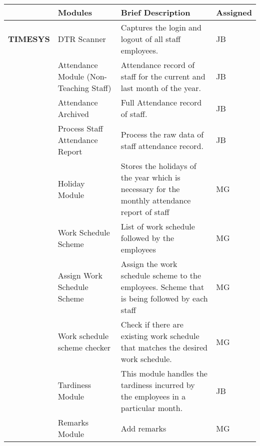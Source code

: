     
\begin{table}[H]
    \begin{tabularx}{\textwidth}{|p{2cm}|p{3.5cm}|X|p{1.5cm}|}
    \toprule
    \multicolumn{1}{|l|}{} & \textbf{Modules}                    & \textbf{Brief Description}                                                                    & \textbf{Assigned} \\ \midrule
    \textbf{TIMESYS}     & DTR Scanner                           & Captures the login and logout of all staff employees.                                         & JB               \\
                        & Attendance Module (Non-Teaching Staff) & Attendance record of staff for the current and last month of the year.                        & JB               \\
                        & Attendance Archived                    & Full Attendance record of staff.                                                              & JB               \\
                        & Process Staff Attendance Report        & Process the raw data of staff attendance record.                                              & JB               \\
                        & Holiday Module                         & Stores the holidays of the year which is necessary for the monthly attendance report of staff & MG               \\
                        & Work Schedule Scheme                   & List of work schedule followed by the employees                                               & MG               \\
                        & Assign Work Schedule Scheme            & Assign the work schedule scheme to the employees. Scheme that is being followed by each staff & MG               \\
                        & Work schedule scheme checker           & Check if there are existing work schedule that matches the desired work schedule.             & MG               \\
                        & Tardiness Module                       & This module handles the tardiness incurred by the employees in a particular month.            & JB               \\
                        & Remarks Module                         & Add remarks                                                                                   & MG               \\

\end{tabularx}
\end{table}
